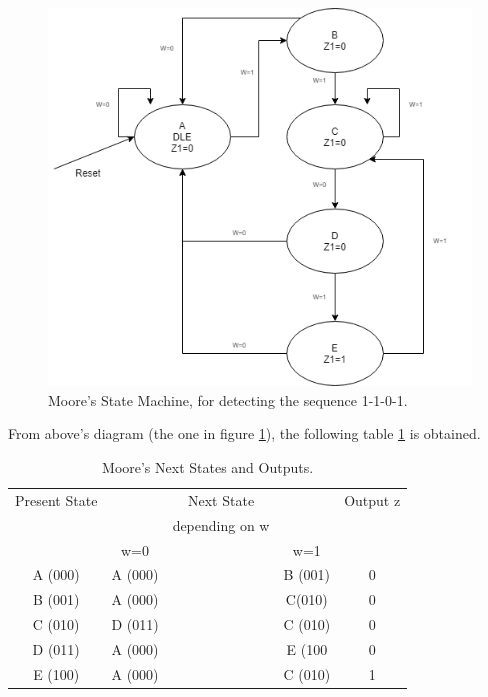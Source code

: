 \begin{figure}[H]
\centering
\includegraphics[scale=0.5]{../Exercise2/EJ2MOORE}
\caption{\color{cyan}Moore's State Machine, for detecting the sequence 1-1-0-1.}
\label{MOOREFSM}
\end{figure}

From above's diagram (the one in figure \ref {MOOREFSM}), the following table \ref {measej1} is obtained. 
\begin{table}[H]
\begin{center}
\begin{tabular}{|c|c c c|c|}
\hline
Present State & & Next State & & Output z \\
 & &depending on w & &  \\
 & w=0 & & w=1 &   \\
\hline
\hline
A  (000) & A (000)& & B (001)& 0   \\
\hline
B (001)& A (000)& & C(010) & 0   \\
\hline
C (010)& D (011)& & C (010)& 0   \\
\hline
D (011)& A (000)& & E (100& 0   \\
\hline
E (100)& A (000)& & C (010)& 1   \\
\hline
\hline
\end{tabular}
\end{center}
\caption{\label{measej1}\color{cyan}Moore's Next States and Outputs.}
\end{table}

